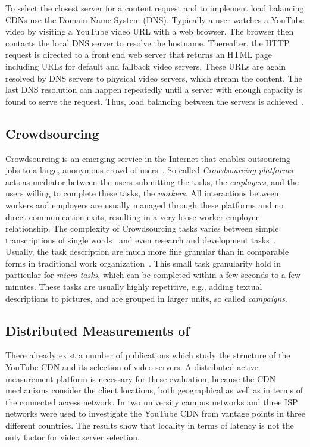 To select the closest server for a content request and to implement load balancing CDNs use the Domain Name System (DNS).
Typically a user watches a YouTube video by visiting a YouTube video URL with a web browser.
The browser then contacts the local DNS server to resolve the hostname.
Thereafter, the HTTP request is directed to a front end web server that returns an HTML page including URLs for default and fallback video servers.
These URLs are again resolved by DNS servers to physical video servers, which stream the content.
The last DNS resolution can happen repeatedly until a server with enough capacity is found to serve the request.
Thus, load balancing between the servers is achieved~\cite{adhikari2012vivisecting}.

\subsection{Crowdsourcing}
Crowdsourcing is an emerging service in the Internet that enables outsourcing jobs to a large, anonymous crowd of users~\cite{articles2013-113}.
So called \emph{Crowdsourcing platforms} acts as mediator between the users submitting the tasks, the \emph{employers}, and the users willing to complete these tasks, the \emph{workers}.
All interactions between workers and employers are usually managed through these platforms and no direct communication exits, resulting in a very loose worker-employer relationship.
The complexity of Crowdsourcing tasks varies between simple transcriptions of single words~\cite{vonAhn2008} and even research and development tasks~\cite{innocentive}.
Usually, the task description are much more fine granular than in comparable forms in traditional work organization~\cite{conf2011-417}. 
This small task granularity hold in particular for \emph{micro-tasks}, which can be completed within a few seconds to a few minutes.
These tasks are usually highly repetitive, e.g., adding textual descriptions to pictures, and are grouped in larger units, so called \emph{campaigns}.

\subsection{Distributed Measurements of }
There already exist a number of publications which study the structure of the YouTube CDN and its selection of video servers.
A distributed active measurement platform is necessary for these evaluation, because the CDN mechanisms consider the client locations, both geographical as well as in terms of the connected access network.
In \cite{torres2011dissecting} two university campus networks and three ISP networks were used to investigate the YouTube CDN from vantage points in three different countries.
The results show that locality in terms of latency is not the only factor for video server selection.


